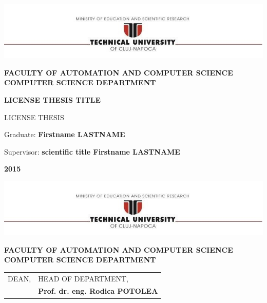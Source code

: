 \documentclass[12pt,a4paper,twoside]{report}
\renewcommand{\thesisyear}{2015}      %
\renewcommand{\thesistitle}{LICENSE THESIS TITLE}
\renewcommand{\thesissupervisor}{scientific title Firstname LASTNAME}
\newcommand{\department}{\bf FACULTY OF AUTOMATION AND COMPUTER SCIENCE\\
COMPUTER SCIENCE DEPARTMENT}
\newcommand{\utcnlogo}{\includegraphics[width=15cm]{img/tucn.jpg}}
\begin{document}

\newenvironment{definition}[1][Defini\c{t}ie.]{\begin{trivlist}
\item[\hskip \labelsep {\bfseries #1}]}{\end{trivlist}}




\setcounter{page}{4}



\begin{center}
\utcnlogo

\department

\vspace{4cm}

{\bf \thesistitle} %

\vspace{1.5cm}

LICENSE THESIS

\vspace{6cm}

Graduate: {\bf Firstname LASTNAME} 

Supervisor: {\bf \thesissupervisor}

\vspace{3cm}
{\bf \thesisyear}
\end{center}

\thispagestyle{empty}
\newpage

\begin{center}
\utcnlogo

\department

\end{center}
\vspace{0.5cm}

\begin{tabular}{p{7cm}p{8cm}}
 \hspace{-1cm}DEAN, & HEAD OF DEPARTMENT,\\
\hspace{-1cm}{\bf Prof. dr. eng. Liviu MICLEA} & {\bf Prof. dr. eng. Rodica POTOLEA}\\  
\end{tabular}
 
\end{document}
